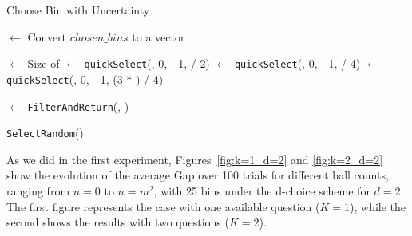 \documentclass[a4paper, 11pt]{article}
\begin{document}
\begin{algorithm}[h]
    \caption{Choose Bin with Uncertainty}
    \label{algo:chooseBinUncertainty}
    \SetAlgoLined  
    
    
    \BlankLine
    
    
    \BlankLine
    
    \CandidateBins $\gets$ Convert $\mathit{chosen\_bins}$ to a vector\;
    
    \BlankLine
    \TotalBins $\gets$ Size of \AllLoads\;
    \MedianLoad $\gets$ \texttt{quickSelect}(\AllLoads, 0, \TotalBins - 1, \TotalBins / 2)\;
    \QFLoad $\gets$ \texttt{quickSelect}(\AllLoads, 0, \TotalBins - 1, \TotalBins / 4)\;
    \QTLoad $\gets$ \texttt{quickSelect}(\AllLoads, 0, \TotalBins - 1, (3 * \TotalBins) / 4)\;
    
    \BlankLine
    \IsBelowMedian $\gets$ \texttt{FilterAndReturn}(\CandidateBins, \MedianLoad)\;
    
    \BlankLine
    
    \BlankLine
    
    \Return \texttt{SelectRandom}(\CandidateBins)\;

\end{algorithm}

As we did in the first experiment, Figures~\ref{fig:k=1_d=2} and \ref{fig:k=2_d=2} show the evolution of the average Gap over 100 trials for different ball counts, ranging from $n=0$ to $n=m^2$, with 25 bins under the d-choice scheme for $d=2$. The first figure represents the case with one available question ($K=1$), while the second shows the results with two questions ($K=2$).
\end{document}
